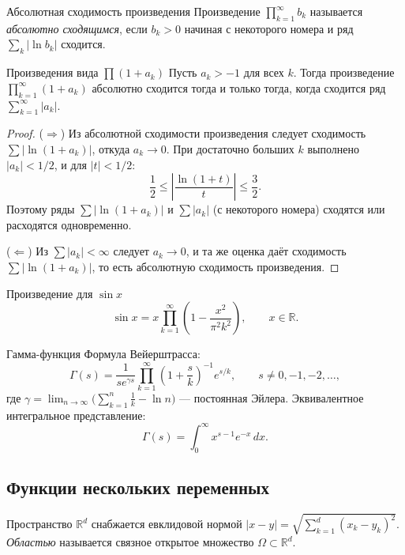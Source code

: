 \begin{Definition}{Абсолютная сходимость произведения}{}
	Произведение $\prod_{k=1}^\infty b_k$ называется \emph{абсолютно сходящимся},
	если $b_k>0$ начиная с некоторого номера и ряд $\sum_k|\ln b_k|$ сходится.
\end{Definition}

\begin{Corollary}{Произведения вида $\prod(1+a_k)$}{}
	Пусть $a_k>-1$ для всех $k$. Тогда произведение $\prod_{k=1}^{\infty}(1+a_k)$
	абсолютно сходится тогда и только тогда, когда сходится ряд $\sum_{k=1}^{\infty}|a_k|$.
\end{Corollary}

\begin{proof}
	($\Rightarrow$) Из абсолютной сходимости произведения следует сходимость $\sum|\ln(1+a_k)|$,
	откуда $a_k\to0$. При достаточно больших $k$ выполнено $|a_k|<1/2$, и для $|t|<1/2$:
	\[
	\frac{1}{2}\le\left|\frac{\ln(1+t)}{t}\right|\le\frac{3}{2}.
	\]
	Поэтому ряды $\sum|\ln(1+a_k)|$ и $\sum|a_k|$ (с некоторого номера) сходятся или расходятся
	одновременно.
	
	($\Leftarrow$) Из $\sum|a_k|<\infty$ следует $a_k\to0$, и та же оценка даёт сходимость
	$\sum|\ln(1+a_k)|$, то есть абсолютную сходимость произведения.
\end{proof}

\begin{Example}{Произведение для $\sin x$}{}
	\[
	\sin x = x\prod_{k=1}^{\infty}\!\left(1-\frac{x^2}{\pi^2k^2}\right),\qquad x\in\mathbb R.
	\]
\end{Example}

\begin{Example}{Гамма-функция}{}
	Формула Вейерштрасса:
	\[
	\Gamma(s)=\frac{1}{se^{\gamma s}}\prod_{k=1}^{\infty}\!\left(1+\frac{s}{k}\right)^{-1}e^{s/k},
	\qquad s\ne0,-1,-2,\ldots,
	\]
	где $\gamma=\lim_{n\to\infty}\!\bigl(\sum_{k=1}^{n}\tfrac1k-\ln n\bigr)$ --- постоянная Эйлера.
	Эквивалентное интегральное представление:
	\[
	\Gamma(s)=\int_0^{\infty}x^{s-1}e^{-x}\,dx.
	\]
\end{Example}

\subsection{Функции нескольких переменных}

Пространство $\mathbb R^d$ снабжается евклидовой нормой
$|x-y|=\sqrt{\sum_{k=1}^{d}(x_k-y_k)^2}$.
\emph{Областью} называется связное открытое множество $\Omega\subset\mathbb R^d$.

